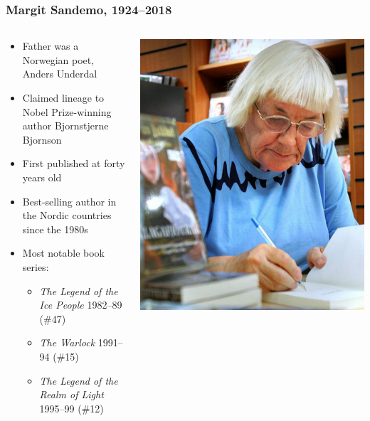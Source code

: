 \begin{frame}
    \frametitle{Margit Sandemo, 1924--2018}
    \begin{columns}[T]
        \begin{column}{0.55\textwidth}
            \begin{itemize}
                \item Father was a Norwegian poet, Anders Underdal
                \item Claimed lineage to Nobel Prize-winning author Bjornstjerne Bjornson
                \item First published at forty years old
                \item Best-selling author in the Nordic countries since the 1980s
                \item Most notable book series:
                \begin{itemize}
                    \item \emph{The Legend of the Ice People} 1982--89 (\#47)
                    \item \emph{The Warlock} 1991--94 (\#15)
                    \item \emph{The Legend of the Realm of Light} 1995--99 (\#12)
                \end{itemize}
            \end{itemize}
        \end{column}
        \begin{column}{0.45\textwidth}
            \centering
            \includegraphics[width=\textwidth]{figures/margit_sandemo}
        \end{column}
    \end{columns}
\end{frame}

